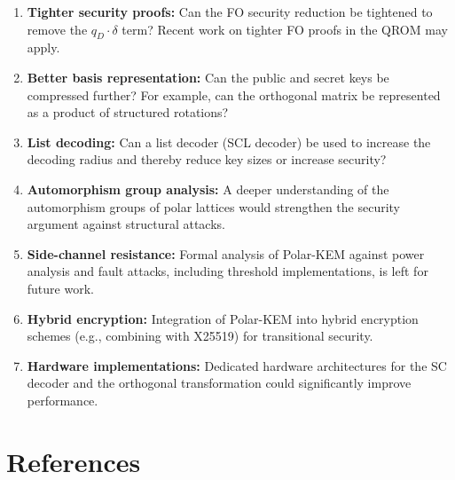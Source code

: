 \documentclass[11pt,a4paper]{article}
\newcommand{\polarKem}{\textsf{Polar-KEM}\xspace}
\newcommand{\FO}{\textsf{FO}\xspace}
\newcommand{\QROM}{\textsf{QROM}\xspace}
\begin{document}
\begin{enumerate}[leftmargin=2em]
\item \textbf{Tighter security proofs:} Can the \FO security reduction be tightened to remove the $q_D \cdot \delta$ term? Recent work on tighter \FO proofs in the \QROM may apply.

\item \textbf{Better basis representation:} Can the public and secret keys be compressed further? For example, can the orthogonal matrix be represented as a product of structured rotations?

\item \textbf{List decoding:} Can a list decoder (SCL decoder) be used to increase the decoding radius and thereby reduce key sizes or increase security?

\item \textbf{Automorphism group analysis:} A deeper understanding of the automorphism groups of polar lattices would strengthen the security argument against structural attacks.

\item \textbf{Side-channel resistance:} Formal analysis of \polarKem against power analysis and fault attacks, including threshold implementations, is left for future work.

\item \textbf{Hybrid encryption:} Integration of \polarKem into hybrid encryption schemes (e.g., combining with X25519) for transitional security.

\item \textbf{Hardware implementations:} Dedicated hardware architectures for the SC decoder and the orthogonal transformation could significantly improve performance.
\end{enumerate}

\section{References}\label{sec:references}
\end{document}
